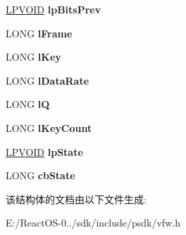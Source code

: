 \begin{DoxyCompactItemize}
\hyperlink{interfacevoid}{L\+P\+V\+O\+ID} {\bfseries lp\+Bits\+Prev}
\item 
\mbox{\label{struct_c_o_m_p_v_a_r_s_af0a76177902804a5eb65c42381b9a993}} 
L\+O\+NG {\bfseries l\+Frame}
\item 
\mbox{\label{struct_c_o_m_p_v_a_r_s_a282da060c343431459e4ca3c1dba4f7a}} 
L\+O\+NG {\bfseries l\+Key}
\item 
\mbox{\label{struct_c_o_m_p_v_a_r_s_afebf15783de633ff521a6567ef378045}} 
L\+O\+NG {\bfseries l\+Data\+Rate}
\item 
\mbox{\label{struct_c_o_m_p_v_a_r_s_a9e7bd8c352b69ff03097d04406560d5c}} 
L\+O\+NG {\bfseries lQ}
\item 
\mbox{\label{struct_c_o_m_p_v_a_r_s_a79969693e9a096a3123cb8035848f040}} 
L\+O\+NG {\bfseries l\+Key\+Count}
\item 
\mbox{\label{struct_c_o_m_p_v_a_r_s_a17fa5635f8adb7e4667f20b3b8466ff9}} 
\hyperlink{interfacevoid}{L\+P\+V\+O\+ID} {\bfseries lp\+State}
\item 
\mbox{\label{struct_c_o_m_p_v_a_r_s_acc355b17900f0bf3589e62c44185f9a4}} 
L\+O\+NG {\bfseries cb\+State}
\end{DoxyCompactItemize}


该结构体的文档由以下文件生成\+:\begin{DoxyCompactItemize}
\item 
E\+:/\+React\+O\+S-\/0../sdk/include/psdk/vfw.\+h\end{DoxyCompactItemize}

